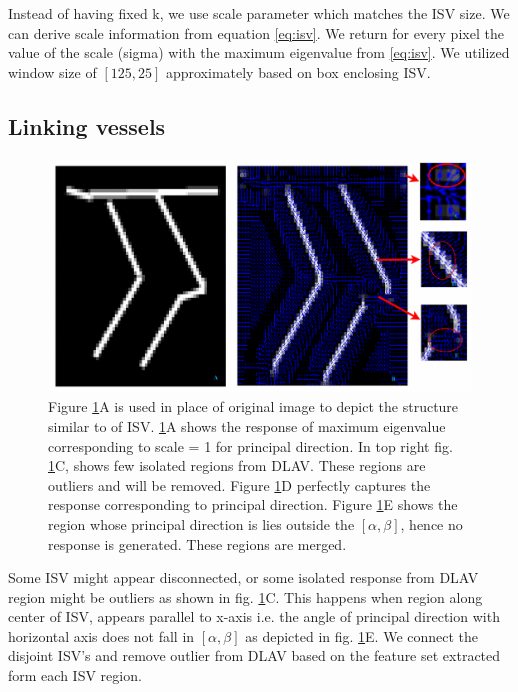 Instead of having fixed k, we use scale parameter which matches the ISV size. We can derive scale information from equation \eqref{eq:isv}. We return for every pixel the value of the scale (sigma) with the maximum eigenvalue from \eqref{eq:isv}. We utilized window size of $[125, 25]$ approximately based on box enclosing ISV.  
 


\subsection{Linking vessels}

\begin{figure}[htb]
  \begin{center}
    \includegraphics[scale=0.25]{figure/highResponse.png}
  \end{center}
  \caption[ISV principal direction estimation]{Figure \ref{responseAnalysis}A is used in place of original image to depict the structure similar to of ISV. \ref{responseAnalysis}A shows the response of maximum eigenvalue corresponding to scale = 1 for principal direction. In top right fig. \ref{responseAnalysis}C, shows few isolated regions from DLAV. These regions are outliers and will be removed. Figure \ref{responseAnalysis}D perfectly captures the response corresponding to principal direction. Figure \ref{responseAnalysis}E shows the region whose principal direction is lies outside the $[\alpha, \beta]$, hence no response is generated. These regions are merged.}
  \label{responseAnalysis}
\end{figure}

Some ISV might appear disconnected, or some isolated response from DLAV region might be outliers as shown in fig. \ref{responseAnalysis}C. This happens when region along center of ISV, appears parallel to x-axis i.e. the angle of principal direction with horizontal axis does not fall in $[\alpha, \beta]$ as depicted in fig. \ref{responseAnalysis}E. We connect the disjoint ISV's and remove outlier from DLAV based on the feature set extracted form each ISV region. 

